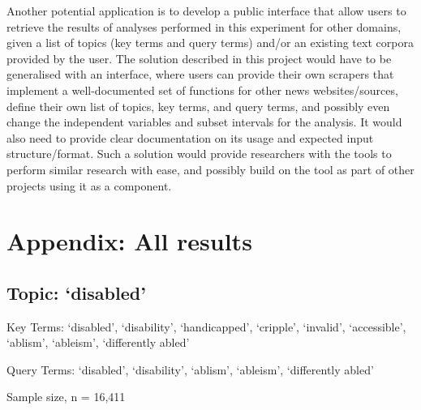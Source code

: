 \documentclass{report}
\begin{document}
Another potential application is to develop a public interface that allow users to retrieve the results of analyses performed in this experiment for other domains, given a list of topics (key terms and query terms) and/or an existing text corpora provided by the user.
The solution described in this project would have to be generalised with an interface, where users can provide their own scrapers that implement a well-documented set of functions for other news websites/sources, define their own list of topics, key terms, and query terms, and possibly even change the independent variables and subset intervals for the analysis.
It would also need to provide clear documentation on its usage and expected input structure/format.
Such a solution would provide researchers with the tools to perform similar research with ease, and possibly build on the tool as part of other projects using it as a component.

\appendix
{}  %

\printbibliography[heading=bibintoc]

\chapter{Appendix: All results}  %

\newpage
\section{Topic: `disabled'}
Key Terms: `disabled', `disability', `handicapped', `cripple', `invalid', `accessible', `ablism', `ableism', `differently abled'

\noindent Query Terms: `disabled', `disability', `ablism', `ableism', `differently abled'

\noindent Sample size, n = 16,411
\end{document}
